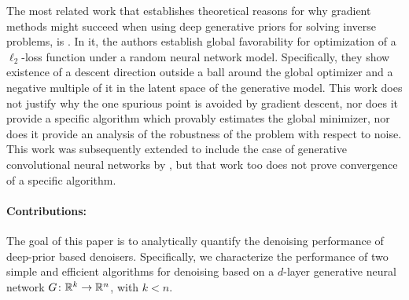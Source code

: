 The most related work that establishes theoretical reasons for why gradient methods might succeed when using deep generative priors for solving inverse problems, is \citep{hand_global_2017}.  In it, the authors establish global favorability for optimization of a $\ell_2$-loss function under a random neural network model.  Specifically, they show existence of a descent direction outside a ball around the global optimizer and a negative multiple of it in the latent space of the generative model.  This work does not justify why the one spurious point is avoided by gradient descent, nor does it provide a specific algorithm which provably estimates the global minimizer, nor does it provide an analysis of the robustness of the problem with respect to noise.  This work was subsequently extended to include the case of generative convolutional neural networks by \cite{ma2018invertibility}, but that work too does not prove convergence of a specific algorithm.




\paragraph{Contributions:}
The goal of this paper is to analytically quantify the denoising performance of deep-prior based denoisers.
Specifically, we characterize the performance of two simple and efficient algorithms for denoising based on a $d$-layer generative neural network
$G\colon \mathbb{R}^k \to \mathbb{R}^{n}$, with $k<n$.

